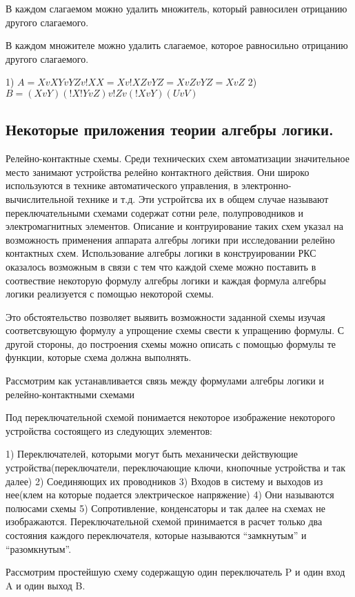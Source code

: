 В каждом слагаемом можно удалить множитель, который равносилен отрицанию другого слагаемого.

В каждом множителе можно удалить слагаемое, которое равносильно отрицанию другого слагаемого.

1) $A = X v XY v YZ v !XX = X v !XZ v YZ = XvZvYZ = X v Z$
2) $B = (X v Y) (!X!YvZ)v!Zv(!XvY)(UvV)$

\subsection{Некоторые приложения теории алгебры логики.}

Релейно-контактные схемы.
Среди технических схем автоматизации значительное место занимают устройства релейно контактного действия.
Они широко используются в технике автоматического управления, в электронно-вычислительной технике и т.д.
Эти устройтсва их в общем случае называют переключательными схемами содержат сотни реле, полупроводников и электромагнитных элементов. Описание и контруирование таких схем
указал на возможность применения аппарата алгебры логики при исследовании релейно контактных схем. Использование алгебры логики в конструировании РКС оказалось возможным в связи с тем что каждой схеме можно поставить в соотвествие некоторую формулу алгебры логики и каждая формула алгебры логики реализуется с помощью некоторой схемы.

Это обстоятельство позволяет выявить возможности заданной схемы изучая соответсвующую формулу а упрощение схемы свести к упращению формулы. С другой стороны, до построения схемы можно описать с помощью формулы те функции, которые схема должна выполнять.

Рассмотрим как устанавливается связь между формулами алгебры логики и релейно-контактными схемами

Под переключательной схемой понимается некоторое изображение некоторого устройства состоящего из следующих элементов:

1) Переключателей, которыми могут быть механически действующие устройства(переключатели, переключающие ключи, кнопочные устройства и так далее)
2) Соединяющих их проводников
3) Входов в систему и выходов из нее(клем на которые подается электрическое напряжение)
4) Они называются полюсами схемы
5) Сопротивление, конденсаторы и так далее на схемах не изображаются. Переключательной схемой принимается в расчет только два состояния каждого переключателя, которые называются ``замкнутым'' и ``разомкнутым''.

Рассмотрим простейшую схему содержащую один переключатель P и один вход A и один выход B.

